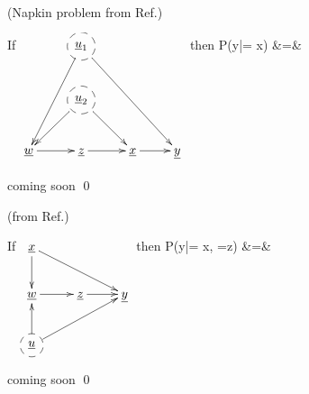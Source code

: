 \begin{claim}(Napkin problem from Ref.\cite{book-why})

If $
\xymatrix{
&*++[F-o]{\rvu_1}\ar[ddl]\ar[ddrr]
\\
&*++[F-o]{\rvu_2}\ar[dl]\ar[dr]
\\
\rvw\ar[r]
&\rvz\ar[r]
&\rvx\ar[r]
&\rvy
}$ then
\beqa
P(y|\cald \rvx = x)
&=&
\eeqa
\end{claim}
\proof
coming soon
\qed
\begin{claim}(from Ref.\cite{book-why})

If $
\xymatrix{
\rvx\ar[d]\ar[drr]
\\
\rvw\ar[r]
&\rvz\ar[r]
&\rvy
\\
*++[F-o]{\rvu}\ar[u]\ar[urr]
}$ then
\beqa
P(y|\cald \rvx = x, \cald\rvz=z)
&=&
\eeqa
\end{claim}
\proof
coming soon
\qed